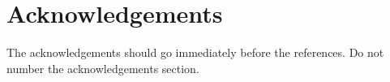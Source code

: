 \documentclass[11pt]{article}
\begin{document}

\section*{Acknowledgements}

The acknowledgements should go immediately before the references.  Do
not number the acknowledgements section.



\end{document}
